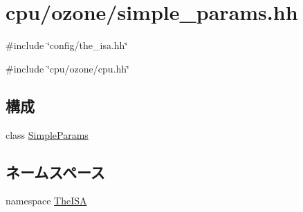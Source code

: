 \hypertarget{simple__params_8hh}{
\section{cpu/ozone/simple\_\-params.hh}
\label{simple__params_8hh}
}
{\ttfamily \#include \char`\"{}config/the\_\-isa.hh\char`\"{}}\par
{\ttfamily \#include \char`\"{}cpu/ozone/cpu.hh\char`\"{}}\par
\subsection*{構成}
\begin{DoxyCompactItemize}
\item 
class \hyperlink{classSimpleParams}{SimpleParams}
\end{DoxyCompactItemize}
\subsection*{ネームスペース}
\begin{DoxyCompactItemize}
\item 
namespace \hyperlink{namespaceTheISA}{TheISA}
\end{DoxyCompactItemize}
